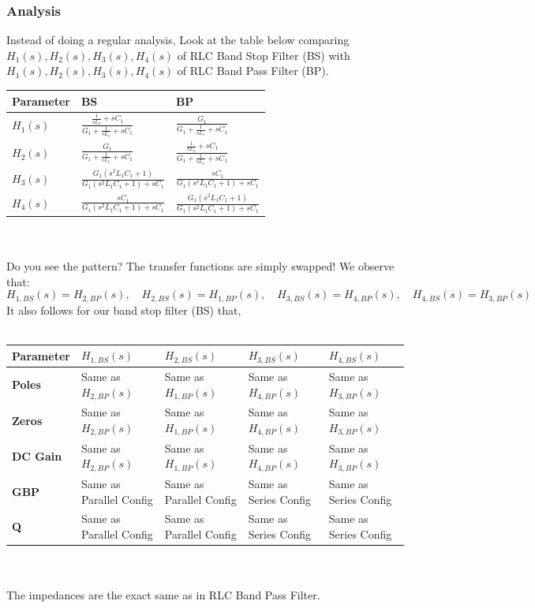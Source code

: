 \subsubsection{Analysis}
Instead of doing a regular analysis, Look at the table below comparing
\(H_1(s), H_2(s), H_3(s), H_4(s)\) of RLC Band Stop Filter (BS) with
\(H_1(s), H_2(s), H_3(s), H_4(s)\) of RLC Band Pass Filter (BP). \\
\begin{tabularx}{\textwidth}{|X|X|X|} \hline
  \textbf{Parameter} & \textbf{BS} & \textbf{BP} \\ \hline
  \(H_1(s)\) & \(\frac{\frac{1}{sL_1} + sC_1}{G_1 + \frac{1}{sL_1} + sC_1}\) & \(\frac{G_1}{G_1 + \frac{1}{sL_1} + sC_1}\) \\ \hline
  \(H_2(s)\) & \(\frac{G_1}{G_1 + \frac{1}{sL_1} + sC_1}\) & \(\frac{\frac{1}{sL_1} + sC_1}{G_1 + \frac{1}{sL_1} + sC_1}\) \\ \hline
  \(H_3(s)\) & \(\frac{G_1(s^2L_1C_1 + 1)}{G_1(s^2L_1C_1 + 1) + sC_1}\) & \(\frac{sC_1}{G_1(s^2L_1C_1 + 1) + sC_1}\) \\ \hline
  \(H_4(s)\) & \(\frac{sC_1}{G_1(s^2L_1C_1 + 1) + sC_1}\) & \(\frac{G_1(s^2L_1C_1 + 1)}{G_1(s^2L_1C_1 + 1) + sC_1}\) \\ \hline
\end{tabularx}\\\\
Do you see the pattern? The transfer functions are simply swapped!
We observe that:
\[
  H_{1,BS}(s) = H_{2,BP}(s), \quad H_{2,BS}(s) = H_{1,BP}(s), \quad H_{3,BS}(s) = H_{4,BP}(s), \quad H_{4,BS}(s) = H_{3,BP}(s)
\]
It also follows for our band stop filter (BS) that, \\\\
\begin{tabularx}{\linewidth}{|X|X|X|X|X|} \hline
  \textbf{Parameter} & \(H_{1,BS}(s)\) & \(H_{2,BS}(s)\) & \(H_{3,BS}(s)\) & \(H_{4,BS}(s)\) \\ \hline
  \textbf{Poles} & Same as \(H_{2,BP}(s)\) & Same as \(H_{1,BP}(s)\) & Same as \(H_{4,BP}(s)\) & Same as \(H_{3,BP}(s)\) \\ \hline
  \textbf{Zeros} & Same as \(H_{2,BP}(s)\) & Same as \(H_{1,BP}(s)\) & Same as \(H_{4,BP}(s)\) & Same as \(H_{3,BP}(s)\) \\ \hline
  \textbf{DC Gain} & Same as \(H_{2,BP}(s)\) & Same as \(H_{1,BP}(s)\) & Same as \(H_{4,BP}(s)\) & Same as \(H_{3,BP}(s)\) \\ \hline
  \textbf{GBP} & Same as Parallel Config & Same as Parallel Config & Same as Series Config & Same as Series Config \\ \hline
  \textbf{Q} & Same as Parallel Config & Same as Parallel Config & Same as Series Config & Same as Series Config \\ \hline
\end{tabularx}\\\\
The impedances are the exact same as in RLC Band Pass Filter.

